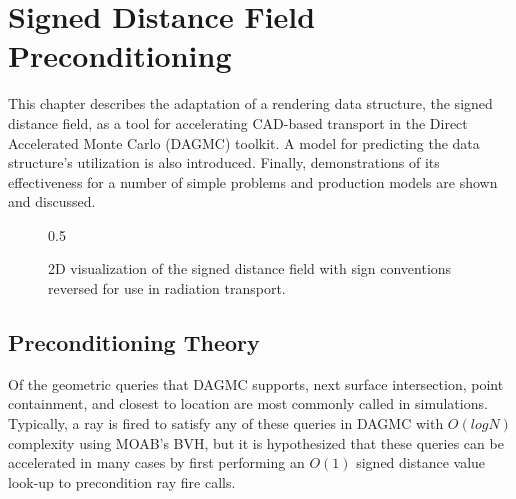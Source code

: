 

\newcommand{\precondQuery}[4] {
  \null %
  \textbf{\uppercase{#1}} 
  \begin{adjustwidth}{1em}{0pt}
    \begin{figure}[H]
      \begin{center}
        {0.65\textwidth}
        \caption{#3}
        \label{fig:#2}
      \end{center}
    \end{figure}
    #4
  \end{adjustwidth}
}

\newcommand{\sdfModel}[2] {
  \null %
  \textbf{\uppercase{#1}} 
  \begin{adjustwidth}{2.5em}{0pt}
    #2
  \end{adjustwidth}
  \null
}

\chapter{Signed Distance Field Preconditioning}\label{ch:preconditioning}

This chapter describes the adaptation of a rendering data structure, the signed
distance field, as a tool for accelerating CAD-based transport in the Direct
Accelerated Monte Carlo (DAGMC) toolkit. A model for predicting the data
structure's utilization is also introduced. Finally, demonstrations of its
effectiveness for a number of simple problems and production models are shown
and discussed.

\begin{figure}[H]
  {0.5\textwidth}
  \centering
  \caption{2D visualization of the signed distance field with sign conventions
    reversed for use in radiation transport.}
  \label{fig:preconditioner_datastruct}
\end{figure}

\section{Preconditioning Theory}\label{section:preconditioner_theory}

Of the geometric queries that DAGMC supports, next surface intersection, point
containment, and closest to location are most commonly called in simulations.
Typically, a ray is fired to satisfy any of these queries in DAGMC with
$O(logN)$ complexity using MOAB's BVH, but it is hypothesized that these queries
can be accelerated in many cases by first performing an $O(1)$ signed distance
value look-up to precondition ray fire calls.


